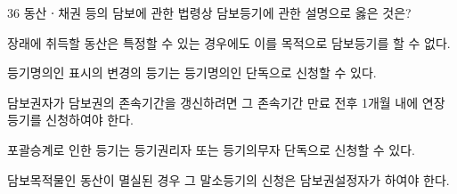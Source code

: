 \begin{question}{36}
동산ㆍ채권 등의 담보에 관한 법령상 담보등기에 관한 설명으로 옳은 것은?
\begin{choices}
  \item 장래에 취득할 동산은 특정할 수 있는 경우에도 이를 목적으로 담보등기를 할 수 없다.
  \item 등기명의인 표시의 변경의 등기는 등기명의인 단독으로 신청할 수 있다.
  \item 담보권자가 담보권의 존속기간을 갱신하려면 그 존속기간 만료 전후 1개월 내에 연장 등기를 신청하여야 한다.
  \item 포괄승계로 인한 등기는 등기권리자 또는 등기의무자 단독으로 신청할 수 있다.
  \item 담보목적물인 동산이 멸실된 경우 그 말소등기의 신청은 담보권설정자가 하여야 한다.
\end{choices}
\end{question}
